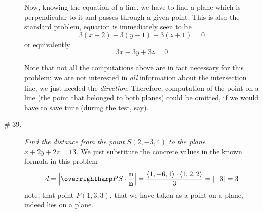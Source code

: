 \documentclass[8pt]{article} %
\begin{document}
\begin{description}
{		Now, knowing the equation of a line, we have to find a plane which is perpendicular to it and passes through a given point. 
		This is also the standard problem, equation is immediately seen to be
		\[3(x-2)-3(y-1)+3(z+1)=0\] or equivalently\[3x-3y+3z=0\]

		Note 
		that not all the computations above are in fact necessary for this problem: we are not interested in \textit{all} information about
		the intersection
		line, we just needed the \textit{direction}. Therefore, computation of the point on a line (the point that belonged to both planes)
		could be omitted, if we would have to save time (during the test, say). 
		}
	\item[\# 39.]{{\it Find the distance from the point $S(2,-3,4)$ to the plane $x+2y+2z=13$.}
		We just substitute the concrete values in the known formula in this problem
		\[d=\myabs{\myvec{PS}\cdot\frac{\mathbf{n}}{\mathbf{n}}}=\frac{\left<1,-6,1\right>\cdot\left<1,2,2\right>}{3}=\myabs{-3}=3\]
		note, that point $P(1,3,3)$, that we have taken as a point on a plane, indeed lies on a plane. 
		}
\end{description}
\end{document}
